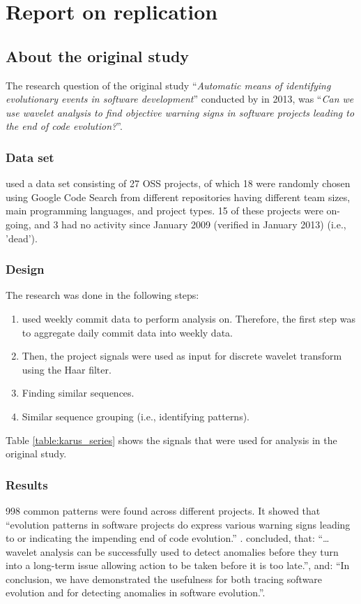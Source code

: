 \chapter{Report on replication}

\section{About the original study}
The research question of the original study ``\emph{Automatic means of
identifying evolutionary events in software development}\rm'' conducted by
\citet{karus2013} in 2013, was ``\emph{Can we use wavelet analysis to find
objective warning signs in software projects leading to the end of code
evolution?}\rm''.

\subsection{Data set}
\citeauthor{karus2013} used a data set consisting of 27 OSS projects, of which
18 were randomly chosen using Google Code Search from different repositories
having different team sizes, main programming languages, and project types. 15
of these projects were on-going, and 3 had no activity since January 2009
(verified in January 2013) (i.e., 'dead').

\subsection{Design}
The research was done in the following steps:
\begin{enumerate}
	\item \citeauthor{karus2013} used weekly commit data to perform analysis on.
		Therefore, the first step was to aggregate daily commit data into weekly data.
	\item Then, the project signals were used as input for discrete wavelet
		transform using the Haar filter.
	\item Finding similar sequences.
	\item Similar sequence grouping (i.e., identifying patterns).
\end{enumerate}

\noindent
Table \ref{table:karus_series} shows the signals that were used for analysis in
the original study.



\subsection{Results}
998 common patterns were found across different projects. It showed that
``evolution patterns in software projects do express various warning signs
leading to or indicating the impending end of code evolution.''
\cite{karus2013}.
\citeauthor{karus2013} concluded, that: ``\ldots wavelet analysis can be
successfully used to detect anomalies before they turn into a long-term issue
allowing action to be taken before it is too late.'', and: ``In conclusion, we
have demonstrated the usefulness for both tracing software evolution and for
detecting anomalies in software evolution.''.

